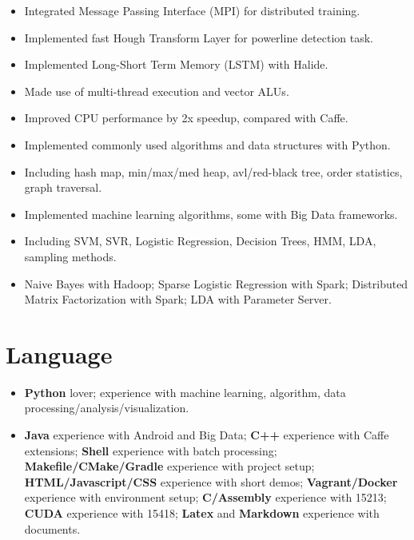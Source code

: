 \documentclass[letterpaper,11pt]{article}
\begin{document}
\begin{itemize}
  \begin{itemize}
  \item Integrated Message Passing Interface (MPI) for distributed training.
  \item Implemented fast Hough Transform Layer for powerline detection task.
  \end{itemize}
  \begin{itemize}
  \item Implemented Long-Short Term Memory (LSTM) with Halide.
  \item Made use of multi-thread execution and vector ALUs.
  \item Improved CPU performance by 2x speedup, compared with Caffe.
  \end{itemize}
  \begin{itemize}
  \item Implemented commonly used algorithms and data structures with Python.
  \item Including hash map, min/max/med heap, avl/red-black tree, order statistics, graph traversal.
  \end{itemize}
  \begin{itemize}
  \item Implemented machine learning algorithms, some with Big Data frameworks.
  \item Including SVM, SVR, Logistic Regression, Decision Trees, HMM, LDA, sampling methods.
  \item Naive Bayes with Hadoop; Sparse Logistic Regression with Spark; Distributed Matrix Factorization with Spark; LDA with Parameter Server.
  \end{itemize}
\end{itemize}

\section*{Language}
\begin{itemize}
\item \textbf{Python} lover; experience with machine learning, algorithm, data processing/analysis/visualization.
\item \textbf{Java} experience with Android and Big Data; \textbf{C++} experience with Caffe extensions; \textbf{Shell} experience with batch processing; \textbf{Makefile/CMake/Gradle} experience with project setup; \textbf{HTML/Javascript/CSS} experience with short demos; \textbf{Vagrant/Docker} experience with environment setup; \textbf{C/Assembly} experience with 15213; \textbf{CUDA} experience with 15418; \textbf{Latex} and \textbf{Markdown} experience with documents.
\end{itemize}
 
\end{document}
